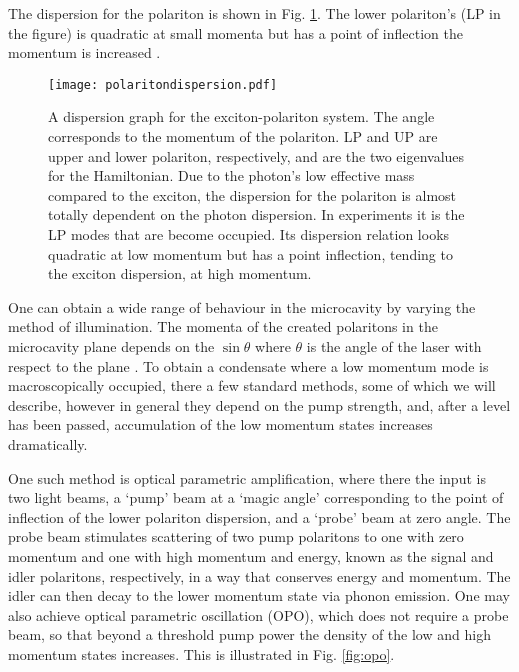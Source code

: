 \documentclass[letterpaper, 10 pt, conference]{IEEEtran}  %
\newcommand{\fig}[1]{Fig. #1}
\begin{document}
The dispersion for the polariton is shown in \fig{\ref{fig:polaritondispersion}}. The lower polariton's (LP in the figure) is quadratic at small momenta but has a point of inflection the momentum is increased \cite{doi:10.1080/00107514.2010.550120}. 

\begin{figure}[htbp!]
	\centering
	\texttt{[image: polaritondispersion.pdf]}
	\caption{A dispersion graph for the exciton-polariton system. The angle corresponds to the momentum of the polariton. LP and UP are upper and lower polariton, respectively, and are the two eigenvalues for the Hamiltonian. Due to the photon's low effective mass compared to the exciton, the dispersion for the polariton is almost totally dependent on the photon dispersion. In experiments it is the LP modes that are become occupied. Its dispersion relation looks quadratic at low momentum but has a point inflection, tending to the exciton dispersion, at high momentum. \cite{doi:10.1080/00107514.2010.550120}}
	\label{fig:polaritondispersion}
\end{figure}

One can obtain a wide range of behaviour in the microcavity by varying the method of illumination. 
The momenta of the created polaritons in the microcavity plane depends on the $\sin \theta$ where $\theta$ is the angle of the laser with respect to the plane \cite{doi:10.1080/00107514.2010.550120}. 
To obtain a condensate where a low momentum mode is macroscopically occupied, there a few standard methods, some of which we will describe, however in general they depend on the pump strength, and, after a level has been passed, accumulation of the low momentum states increases dramatically.

One such method is optical parametric amplification, where there the input is two light beams, a `pump' beam at a `magic angle' corresponding to the point of inflection of the lower polariton dispersion, and a `probe' beam at zero angle. 
The probe beam stimulates scattering of two pump polaritons to one with zero momentum and one with high momentum and energy, known as the signal and idler polaritons, respectively, in a way that conserves energy and momentum. 
The idler can then decay to the lower momentum state via phonon emission.
One may also achieve optical parametric oscillation (OPO), which does not require a probe beam, so that beyond a threshold pump power the density of the low and high momentum states increases.
This is illustrated in \fig{\ref{fig:opo}}.
\end{document}
